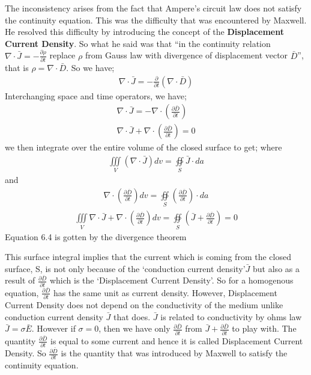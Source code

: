 The inconsistency arises from the fact that Ampere's circuit law does not satisfy the continuity equation. This was the difficulty that was encountered by Maxwell. He resolved this difficulty by introducing the concept of the \textbf{Displacement Current Density}. So what he said was that \textquotedblleft in the continuity relation $\nabla\cdot\bar{J}=-\frac{\partial\rho}{\partial t}$ replace $\rho$ from Gauss law with divergence of displacement vector $\bar{D}$\textquotedblright, that is $\rho=\nabla\cdot\bar{D}$. So we have;
\begin{align}
	\nabla\cdot\bar{J}=-\frac{\partial}{\partial t}(\nabla\cdot\bar{D})
\end{align}
Interchanging space and time operators, we have;
\begin{align}
	\nabla\cdot\bar{J}=-\nabla\cdot(\frac{\partial\bar{D}}{\partial t})\\
	\nabla\cdot\bar{J}+\nabla\cdot(\frac{\partial\bar{D}}{\partial t}) = 0
\end{align}
we then integrate over the entire volume of the closed surface to get;
where 
\begin{align}
	\iiint\limits_V(\nabla\cdot\bar{J}) dv = \oiint\limits_S\bar{J}\cdot da
\end{align} and
\begin{align}
	\nabla\cdot(\frac{\partial\bar{D}}{\partial t})dv = \oiint\limits_S(\frac{\partial\bar{D}}{\partial t})\cdot da
\end{align}
\begin{align}
	\iiint\limits_V\nabla\cdot\bar{J}+\nabla\cdot(\frac{\partial\bar{D}}{\partial t})dv=
	\oiint\limits_S(\bar{J}+\frac{\partial\bar{D}}{\partial t})=0
\end{align}
Equation 6.4 is gotten by the divergence theorem

This surface integral implies that the current which is coming from the closed surface, S, is not only because of the \textquoteleft conduction current density\textquoteright $\bar{J}$ but also as a result of $\frac{\partial\bar{D}}{\partial t}$ which is the \textquoteleft Displacement Current Density\textquoteright. So for a homogenous equation, $\frac{\partial\bar{D}}{\partial t}$ has the same unit as current density. However, Displacement Current Density does not depend on the conductivity of the medium unlike conduction current density $\bar{J}$ that does. $\bar{J}$ is related to conductivity by ohms law $\bar{J}=\sigma\bar{E}$. However if $\sigma=0$, then we have only $\frac{\partial\bar{D}}{\partial t}$ from $\bar{J}+\frac{\partial\bar{D}}{\partial t}$ to play with. The quantity $\frac{\partial\bar{D}}{\partial t}$ is equal to some current and hence it is called Displacement Current Density. So $\frac{\partial\bar{D}}{\partial t}$ is the quantity that was introduced by Maxwell to satisfy the continuity equation.

